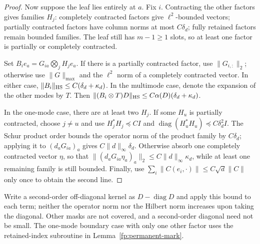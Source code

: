 \documentclass[a4paper]{tufte-handout}
\begin{document}
\begin{fullwidth}
\begin{proof}
Now suppose the leaf lies entirely at $a$. Fix $i$. Contracting the other factors gives families $H_j$: completely contracted factors give
$\ell^2$-bounded vectors; partially contracted factors have column norms at most $C\delta_d$; fully retained factors remain bounded families.
The leaf still has $m-1\ge1$ slots, so at least one factor is partially or completely contracted.

Set $B_ie_a=G_{ia}\bigotimes_jH_j e_a$. If there is a partially contracted factor, use $\|G_{i,:}\|_2$;
otherwise use $\|G\|_{\max}$ and the $\ell^2$ norm of a completely contracted vector. In either case,
$\|B_i\|_{\rm HS}\le C(\delta_d+\kappa_d)$.
In the multimode case, denote the expansion of the other modes by $T$. Then
$\|(B_i\otimes T)D\|_{\rm HS}\le C\alpha(D)(\delta_d+\kappa_d)$.

In the one-mode case, there are at least two $H_j$. If some $H_u$ is partially contracted, choose $j\ne u$ and use
$H_j^*H_j\preceq CI$ and $\operatorname{diag}(H_u^*H_u)\preceq C\delta_d^2I$.
The Schur product order bounds the operator norm of the product family by $C\delta_d$; applying it to $(d_aG_{ia})_a$ gives
$C\|d\|_\infty\delta_d$. Otherwise absorb one completely contracted vector $\eta$,
so that $\|(d_aG_{ia}\eta_a)_a\|_2\le C\|d\|_\infty\kappa_d$, while at least one remaining family is still bounded.
Finally, use $\sum_i\|C(e_i,\cdot)\|\le C\sqrt d\|C\|$ only once to obtain the second line.
\end{proof}
Write a second-order off-diagonal kernel as $D-\operatorname{diag}D$ and apply this bound to each term; neither the operator norm
nor the Hilbert norm increases upon taking the diagonal. Other masks are not covered, and a second-order diagonal need not be small.
The one-mode boundary case with only one other factor uses the retained-index subroutine in Lemma~\ref{fp:permanent-mark}.


\end{fullwidth}
\end{document}
